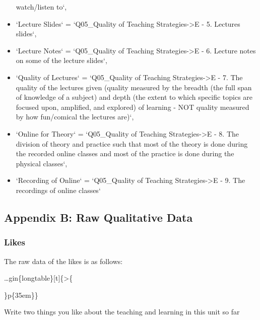 \documentclass[
]{article}
\begin{document}
\begin{itemize}
  watch/listen to`,
\item
  `Lecture Slides` = `Q05\_Quality of Teaching Strategies-\textgreater E
  - 5. Lectures slides`,
\item
  `Lecture Notes` = `Q05\_Quality of Teaching Strategies-\textgreater E
  - 6. Lecture notes on some of the lecture slides`,
\item
  `Quality of Lectures` = `Q05\_Quality of Teaching
  Strategies-\textgreater E - 7. The quality of the lectures given
  (quality measured by the breadth (the full span of knowledge of a
  subject) and depth (the extent to which specific topics are focused
  upon, amplified, and explored) of learning - NOT quality measured by
  how fun/comical the lectures are)`,
\item
  `Online for Theory` = `Q05\_Quality of Teaching
  Strategies-\textgreater E - 8. The division of theory and practice
  such that most of the theory is done during the recorded online
  classes and most of the practice is done during the physical classes`,
\item
  `Recording of Online` = `Q05\_Quality of Teaching
  Strategies-\textgreater E - 9. The recordings of online classes`
\end{itemize}

\newpage

\subsection{Appendix B: Raw Qualitative
Data}\label{appendix-b-raw-qualitative-data}

\subsubsection{Likes}\label{likes}

The raw data of the likes is as follows:

\ldots gin\{longtable\}{[}t{]}\{\textgreater\{

\raggedright

\arraybackslash\}p\{35em\}\}

\caption{\label{tab:RawLikesData}Write two things you like about the teaching and learning in this unit so far}
\end{document}
